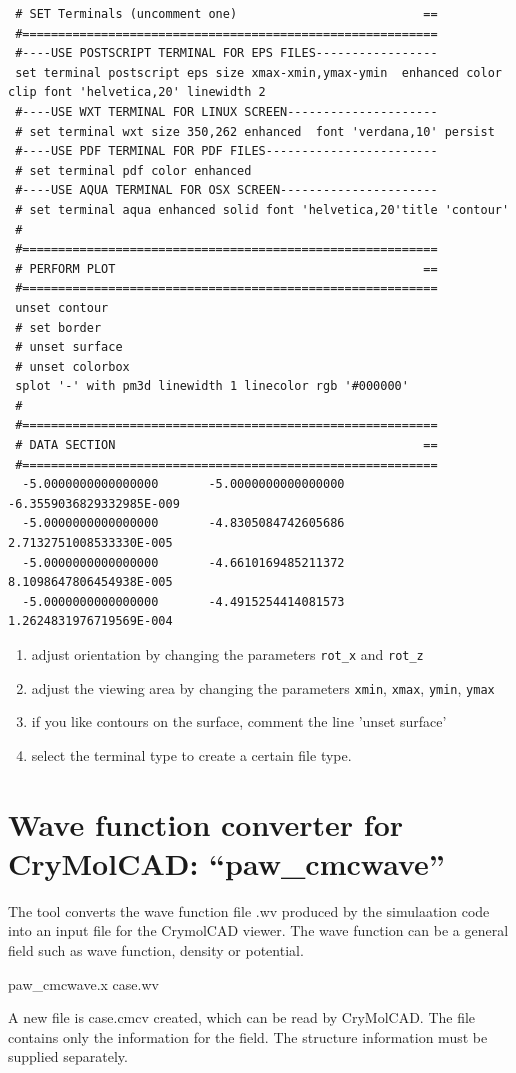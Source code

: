 \documentclass[final,12pt]{article}
\begin{document}
{{{{{{{\begin{verbatim}
 # SET Terminals (uncomment one)                          ==
 #==========================================================
 #----USE POSTSCRIPT TERMINAL FOR EPS FILES-----------------
 set terminal postscript eps size xmax-xmin,ymax-ymin  enhanced color clip font 'helvetica,20' linewidth 2 
 #----USE WXT TERMINAL FOR LINUX SCREEN---------------------
 # set terminal wxt size 350,262 enhanced  font 'verdana,10' persist 
 #----USE PDF TERMINAL FOR PDF FILES------------------------
 # set terminal pdf color enhanced 
 #----USE AQUA TERMINAL FOR OSX SCREEN----------------------
 # set terminal aqua enhanced solid font 'helvetica,20'title 'contour'
 #
 #==========================================================
 # PERFORM PLOT                                           ==
 #==========================================================
 unset contour
 # set border
 # unset surface
 # unset colorbox
 splot '-' with pm3d linewidth 1 linecolor rgb '#000000'
 #
 #==========================================================
 # DATA SECTION                                           ==
 #==========================================================
  -5.0000000000000000       -5.0000000000000000       -6.3559036829332985E-009
  -5.0000000000000000       -4.8305084742605686        2.7132751008533330E-005
  -5.0000000000000000       -4.6610169485211372        8.1098647806454938E-005
  -5.0000000000000000       -4.4915254414081573        1.2624831976719569E-004
\end{verbatim}}

\begin{enumerate}
\item adjust orientation by changing the parameters \verb|rot_x| and
  \verb|rot_z|
\item adjust the viewing area by changing the parameters \verb|xmin|,
  \verb|xmax|, \verb|ymin|, \verb|ymax|
\item if you like contours on the surface, comment the line 'unset surface'
\item select the terminal type to create a certain file type.
\end{enumerate}



\newpage
\section{Wave function converter for CryMolCAD: ``paw\_cmcwave''}
The tool converts the wave function file .wv produced by the
simulaation code into an input file for the CrymolCAD viewer. The wave
function can be a general field such as wave function, density or
potential.
\begin{center}
paw\_cmcwave.x case.wv
\end{center}
A new file is case.cmcv created, which can be read by CryMolCAD. The
file contains only the information for the field. The structure
information must be supplied separately.


}}}}}}
\end{document}
